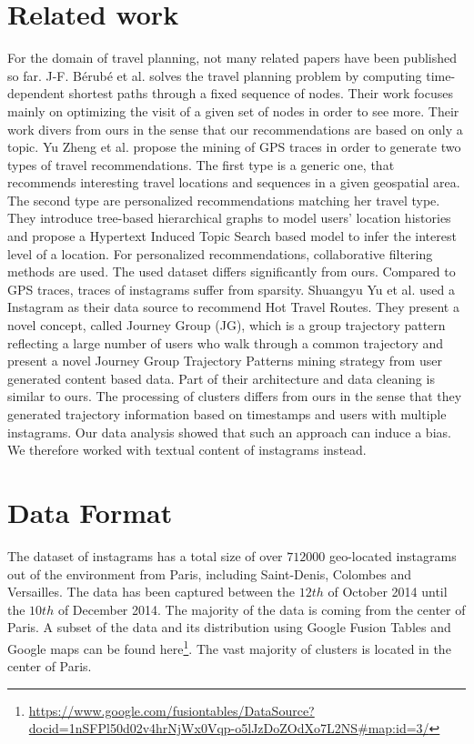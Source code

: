\section{Related work}
For the domain of travel planning, not many related papers have been published so far. J-F. Bérubé et al. \cite{berube2006time} solves the travel planning problem by computing time-dependent shortest paths through a fixed sequence of nodes. Their work focuses mainly on optimizing the visit of a given set of nodes in order to see more. Their work divers from ours in the sense that our recommendations are based on only a topic. Yu Zheng et al. \cite{} propose the mining of GPS traces in order to generate two types of travel recommendations. The first type is a generic one, that recommends interesting travel locations and sequences in a given geospatial area. The second type are personalized recommendations matching her travel type. They introduce tree-based hierarchical graphs to model users' location histories and propose a Hypertext Induced Topic Search based model to infer the interest level of a location. For personalized recommendations, collaborative filtering methods are used. The used dataset differs significantly from ours. Compared to GPS traces, traces of instagrams suffer from sparsity. Shuangyu Yu et al. \cite{Yu:2014:PDJ:2678534.2678823} used a Instagram as their data source to recommend Hot Travel Routes. They present a novel concept, called Journey Group (JG), which is a group trajectory pattern reflecting a large number of users who walk through a common trajectory and present a novel Journey Group Trajectory Patterns mining strategy from user generated content based data. Part of their architecture and data cleaning is similar to ours. The processing of clusters differs from ours in the sense that they generated trajectory information based on timestamps and users with multiple instagrams. Our data analysis showed that such an approach can induce a bias. We therefore worked with textual content of instagrams instead.


\section{Data Format}
\label{sct:data}

The dataset of instagrams has a total size of over $712000$ geo-located instagrams out of the environment from Paris, including Saint-Denis, Colombes and Versailles. The data has been captured between the $12th$ of October 2014 until the $10th$ of December 2014. The majority of the data is coming from the center of Paris. A subset of the data and its distribution using Google Fusion Tables and Google maps can be found here\footnote{\url{https://www.google.com/fusiontables/DataSource?docid=1nSFPl50d02v4hrNjWx0Vqp-o5lJzDoZOdXo7L2NS\#map:id=3/}}. The vast majority of clusters is located in the center of Paris.

